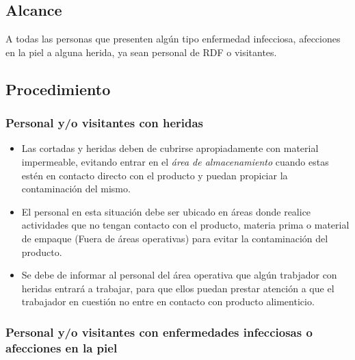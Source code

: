 \subsection{Alcance}

A todas las personas que presenten algún tipo enfermedad infecciosa, afecciones en la piel a alguna herida, ya sean personal de \gls{RDF} o visitantes.

\subsection{Procedimiento}

\subsubsection{Personal y/o visitantes con heridas}

\begin{itemize}
	\item Las cortadas y heridas deben de cubrirse apropiadamente con material impermeable, evitando entrar en el \emph{área de almacenamiento} cuando estas estén en contacto directo con el producto y puedan propiciar la contaminación del mismo.
	\item El personal en esta situación debe ser ubicado en áreas donde realice actividades que no tengan contacto con el producto, materia prima o material de empaque (Fuera de áreas operativas) para evitar la contaminación del producto.
	\item Se debe de informar al personal del área operativa que algún trabjador con heridas entrará a trabajar, para que ellos puedan prestar atención a que el trabajador en cuestión no entre en contacto con producto alimenticio.
\end{itemize}

\subsubsection{Personal y/o visitantes con enfermedades infecciosas o afecciones en la piel}

